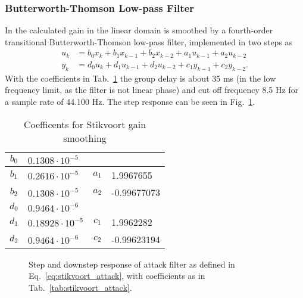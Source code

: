 \documentclass[../main2.tex]{subfiles}
\providecommand{\rootdir}{..}
\begin{document}
\subsubsection{Butterworth-Thomson Low-pass Filter}
In \cite{stikvoort1986digital} the calculated gain in the linear domain is smoothed by a fourth-order transitional Butterworth-Thomson low-pass filter, implemented in two steps as
\begin{equation}\label{eq:stikvoort_attack}
\begin{split}
u_k &= b_0 x_k + b_1 x_{k-1} + b_2 x_{k-2} + a_1 u_{k-1} + a_2 u_{k-2}\\
y_k &= d_0 u_k + d_1 u_{k-1} + d_2 u_{k-2} + c_1 y_{k-1} + c_2 y_{k-2}.
\end{split}
\end{equation}
With the coefficients in Tab.~\ref{tab:coeff_stikvoort_attack}  the group delay is about 35 ms (in the low frequency limit, as the filter is not linear phase) and cut off frequency 8.5 Hz for a sample rate of 44.100 Hz. The step response can be seen in Fig.~\ref{fig:step_stikvoort_attack}. 
\begin{table}[h]
\begin{center}
\caption{Coefficents for Stikvoort gain smoothing}
\label{tab:coeff_stikvoort_attack}
 \begin{tabular}{ c l | c l}	
    \hline
    $b_0$ & $0.1308 \cdot 10^{-5}$ &              &                          \\ \hline
    $b_1$ & $0.2616 \cdot 10^{-5}$ & $a_1$ & 1.9967655     \\ \hline
    $b_2$ & $0.1308 \cdot 10^{-5}$ & $a_2$ & -0.99677073  \\ \hline \hline

    $d_0$ & $0.9464  \cdot 10^{-6}$   &         &                             \\ \hline
    $d_1$ & $0.18928 \cdot 10^{-5}$ & $c_1$ & 1.9962282     \\ \hline
    $d_2$ & $0.9464  \cdot 10^{-6}$  & $c_2$ & -0.99623194  \\ \hline
\end{tabular}
\end{center}
\end{table}
\begin{figure}
\centerline{}
\caption{Step and downstep response of attack filter as defined in Eq.~\eqref{eq:stikvoort_attack}, with coefficients as in Tab.~\ref{tab:stikvoort_attack}.}
\label{fig:step_stikvoort_attack}
\end{figure}
\end{document}
